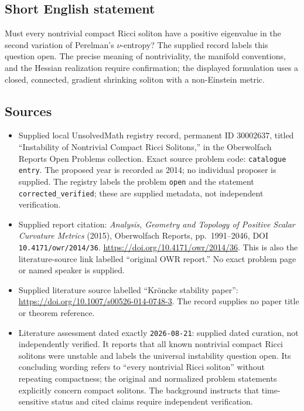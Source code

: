 \documentclass[11pt]{article}
\begin{document}
\subsection{Short English statement}
Must every nontrivial compact Ricci soliton have a positive eigenvalue in the second variation of Perelman's \(\nu\)-entropy? The supplied record labels this question open. The precise meaning of nontriviality, the manifold conventions, and the Hessian realization require confirmation; the displayed formulation uses a closed, connected, gradient shrinking soliton with a non-Einstein metric.
\subsection{Sources}
\begin{itemize}
\item Supplied local UnsolvedMath registry record, permanent ID \(30002637\), titled ``Instability of Nontrivial Compact Ricci Solitons,'' in the Oberwolfach Reports Open Problems collection. Exact source problem code: \texttt{catalogue entry}. The proposed year is recorded as 2014; no individual proposer is supplied. The registry labels the problem \texttt{open} and the statement \texttt{corrected\_verified}; these are supplied metadata, not independent verification.
\item Supplied report citation: \emph{Analysis, Geometry and Topology of Positive Scalar Curvature Metrics} (2015), Oberwolfach Reports, pp.\ 1991--2046, DOI \texttt{10.4171/owr/2014/36}. \url{https://doi.org/10.4171/owr/2014/36}. This is also the literature-source link labelled ``original OWR report.'' No exact problem page or named speaker is supplied.
\item Supplied literature source labelled ``Kröncke stability paper'': \url{https://doi.org/10.1007/s00526-014-0748-3}. The record supplies no paper title or theorem reference.
\item Literature assessment dated exactly \texttt{2026-08-21}: supplied dated curation, not independently verified. It reports that all known nontrivial compact Ricci solitons were unstable and labels the universal instability question open. Its concluding wording refers to ``every nontrivial Ricci soliton'' without repeating compactness; the original and normalized problem statements explicitly concern compact solitons. The background instructs that time-sensitive status and cited claims require independent verification.
\end{itemize}
\end{document}
